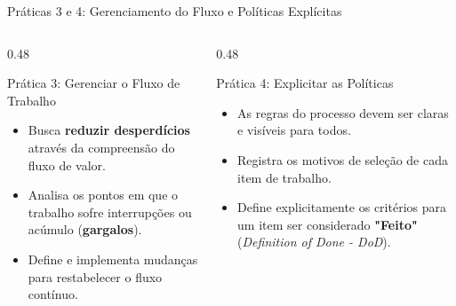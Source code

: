 \documentclass[aspectratio=169, 9pt]{beamer}
\begin{document}
\begin{frame}{Práticas 3 e 4: Gerenciamento do Fluxo e Políticas Explícitas}
  \begin{columns}[T]
    \begin{column}{0.48\textwidth}
      \begin{block}{Prática 3: Gerenciar o Fluxo de Trabalho}
        \begin{itemize}
          \item Busca \textbf{reduzir desperdícios} através da compreensão do fluxo de valor.
          \item Analisa os pontos em que o trabalho sofre interrupções ou acúmulo (\textbf{gargalos}).
          \item Define e implementa mudanças para restabelecer o fluxo contínuo.
        \end{itemize}
      \end{block}
    \end{column}

    \begin{column}{0.48\textwidth}
      \begin{exampleblock}{Prática 4: Explicitar as Políticas}
        \begin{itemize}
          \item As regras do processo devem ser claras e visíveis para todos.
          \item Registra os motivos de seleção de cada item de trabalho.
          \item Define explicitamente os critérios para um item ser considerado \textbf{"Feito"} (\textit{Definition of Done - DoD}).
        \end{itemize}
      \end{exampleblock}
    \end{column}
  \end{columns}
\end{frame}
\end{document}
